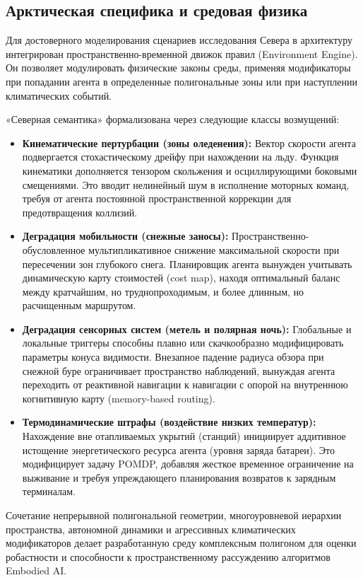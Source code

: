 \documentclass[11pt,a4paper]{article}
\begin{document}
\subsection{Арктическая специфика и средовая физика}

Для достоверного моделирования сценариев исследования Севера в архитектуру интегрирован пространственно-временной движок правил (Environment Engine). Он позволяет модулировать физические законы среды, применяя модификаторы при попадании агента в определенные полигональные зоны или при наступлении климатических событий. 

«Северная семантика» формализована через следующие классы возмущений:
\begin{itemize}
    \item \textbf{Кинематические пертурбации (зоны оледенения):} Вектор скорости агента подвергается стохастическому дрейфу при нахождении на льду. Функция кинематики дополняется тензором скольжения и осциллирующими боковыми смещениями. Это вводит нелинейный шум в исполнение моторных команд, требуя от агента постоянной пространственной коррекции для предотвращения коллизий.
    \item \textbf{Деградация мобильности (снежные заносы):} Пространственно-обусловленное мультипликативное снижение максимальной скорости при пересечении зон глубокого снега. Планировщик агента вынужден учитывать динамическую карту стоимостей (cost map), находя оптимальный баланс между кратчайшим, но труднопроходимым, и более длинным, но расчищенным маршрутом.
    \item \textbf{Деградация сенсорных систем (метель и полярная ночь):} Глобальные и локальные триггеры способны плавно или скачкообразно модифицировать параметры конуса видимости. Внезапное падение радиуса обзора при снежной буре ограничивает пространство наблюдений, вынуждая агента переходить от реактивной навигации к навигации с опорой на внутреннюю когнитивную карту (memory-based routing).
    \item \textbf{Термодинамические штрафы (воздействие низких температур):} Нахождение вне отапливаемых укрытий (станций) инициирует аддитивное истощение энергетического ресурса агента (уровня заряда батареи). Это модифицирует задачу POMDP, добавляя жесткое временное ограничение на выживание и требуя упреждающего планирования возвратов к зарядным терминалам.
\end{itemize}

Сочетание непрерывной полигональной геометрии, многоуровневой иерархии пространства, автономной динамики и агрессивных климатических модификаторов делает разработанную среду комплексным полигоном для оценки робастности и способности к пространственному рассуждению алгоритмов Embodied AI.
\end{document}
